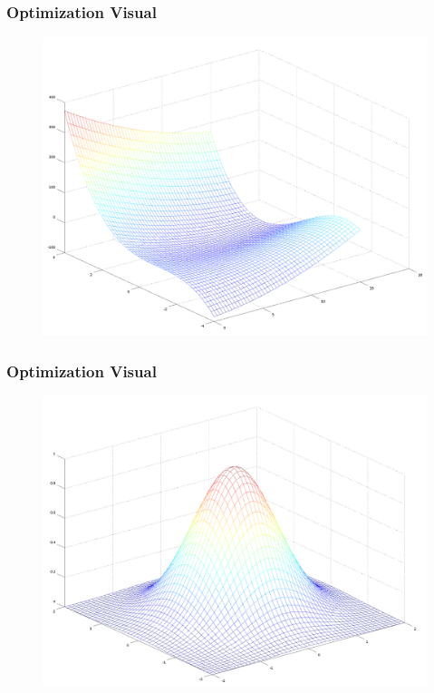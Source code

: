 \documentclass[xcolor=dvipsnames]{beamer}
\begin{document}
\begin{frame}
  \frametitle{Optimization Visual}
  \begin{figure}[h]
    \includegraphics[scale=0.27]{./diagrams/threed2.png}
  \end{figure}
\end{frame}

\begin{frame}
  \frametitle{Optimization Visual}
  \begin{figure}[h]
    \includegraphics[scale=0.27]{./diagrams/threed3.png}
  \end{figure}
\end{frame}
\end{document}
